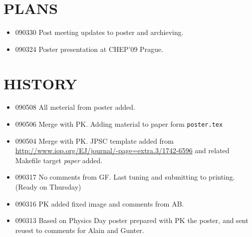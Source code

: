 \begin{appendix}
\section{PLANS}
\begin{itemize}
\item 090330 Post meeting updates to poster and archieving.
\item 090324 Poster presentation at CHEP'09 Prague.
\end{itemize}

\section{HISTORY}
\begin{itemize}
\item 090508 All meterial from poster added.
\item 090506 Merge with PK. Adding material to paper form {\tt poster.tex}
\item 090504 Merge with PK. JPSC template added from \url{http://www.iop.org/EJ/journal/-page=extra.3/1742-6596} and
related Makefile target {\em paper} added.
\item 090317 No comments from GF. Last tuning and submitting to printing. (Ready on Thursday)
\item 090316  PK added  fixed image and comments from AB. 
\item 090313 Based on Physics Day poster prepared with PK the poster, 
             and sent reuest to comments for Alain and Gunter.
\end{itemize}
\end{appendix}

